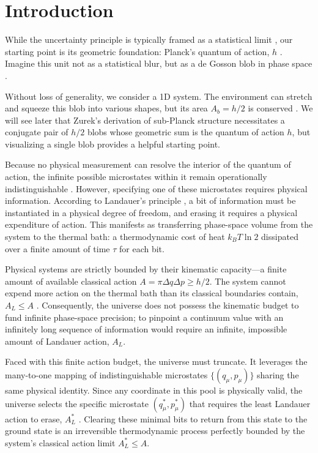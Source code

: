 \documentclass[%
  aps, reprint, prl, amsmath,amssymb
]{revtex4-2}
\begin{document}
\section{Introduction}

While the uncertainty principle is typically framed as a statistical limit \cite{Robertson1929}, our starting point is its geometric foundation: Planck's quantum of action, $h$ \cite{Planck1901, Planck1906}. Imagine this unit not as a statistical blur, but as a de Gosson blob in phase space \cite{DeGosson2008}. 

Without loss of generality, we consider a 1D system. The environment can stretch and squeeze this blob into various shapes, but its area $A_b=h/2$ is conserved \cite{Gromov1985}. We will see later that Zurek's derivation of sub-Planck structure \cite{Zurek2001} necessitates a conjugate pair of $h/2$ blobs whose geometric sum is the quantum of action $h$, but visualizing a single blob provides a helpful starting point.

Because no physical measurement can resolve the interior of the quantum of action, the infinite possible microstates within it remain operationally indistinguishable \cite{Brillouin1956, Peres1993, VonNeumann1932, Gromov1985}. However, specifying one of these microstates requires physical information. According to Landauer's principle \cite{Landauer1961}, a bit of information must be instantiated in a physical degree of freedom, and erasing it requires a physical expenditure of action. This manifests as transferring phase-space volume from the system to the thermal bath: a thermodynamic cost of heat $k_B T \ln{2}$ dissipated over a finite amount of time $\tau$ for each bit.

Physical systems are strictly bounded by their kinematic capacity---a finite amount of available classical action $A = \pi \Delta q \Delta p \ge h/2$. The system cannot expend more action on the thermal bath than its classical boundaries contain, $A_L \le A$ \cite{Lloyd2000}. Consequently, the universe does not possess the kinematic budget to fund infinite phase-space precision; to pinpoint a continuum value with an infinitely long sequence of information would require an infinite, impossible amount of Landauer action, $A_L$.

Faced with this finite action budget, the universe must truncate. It leverages the many-to-one mapping of indistinguishable microstates $\{(q_\mu, p_\mu)\}$ sharing the same physical identity. Since any coordinate in this pool is physically valid, the universe selects the specific microstate $(q_\mu^*, p_\mu^*)$ that requires the least Landauer action to erase, $A_L^*$ \cite{FeynmanHibbs1965, Landauer1961}. Clearing these minimal bits to return from this state to the ground state is an irreversible thermodynamic process perfectly bounded by the system's classical action limit $A_L^* \le A$.
\end{document}
